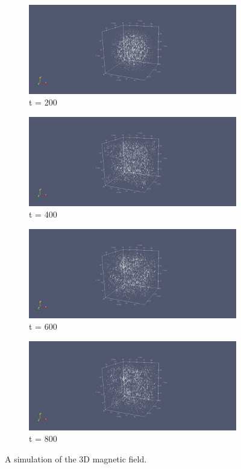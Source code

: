 \begin{figure}[h!]
	\centering
	\begin{subfigure}{.49\textwidth}
		\centering
		\includegraphics[width=.95\linewidth]{Figures/FDTD3DH1}
		\caption{t = 200}
	\end{subfigure}
	\begin{subfigure}{.49\textwidth}
		\centering
		\includegraphics[width=.95\linewidth]{Figures/FDTD3DH2}
		\caption{t = 400}
	\end{subfigure}
	\begin{subfigure}{.49\textwidth}
		\centering
		\includegraphics[width=.95\linewidth]{Figures/FDTD3DH3}
		\caption{t = 600}
	\end{subfigure}
	\begin{subfigure}{.49\textwidth}
		\centering
		\includegraphics[width=.95\linewidth]{Figures/FDTD3DH4}
		\caption{t = 800}
	\end{subfigure}
	\decoRule
	\caption[3D Magnetic Field Simulation]{A simulation of the 3D magnetic field.}
	\label{fig:FDTD3DH}
\end{figure}